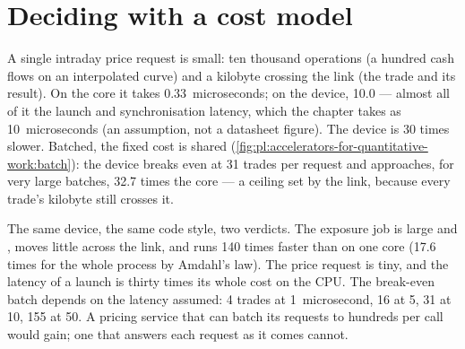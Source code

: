 \section{Deciding with a cost model}

A single intraday price request is small: ten thousand operations (a hundred cash flows on an interpolated curve) and a kilobyte crossing
the link (the trade and its result). On the core it takes 0.33~microseconds; on the device, 10.0 --- almost all of it the launch and
synchronisation latency, which the chapter takes as 10~microseconds (an assumption, not a datasheet figure). The device is 30 times slower.
Batched, the fixed cost is shared (\cref{fig:pl:accelerators-for-quantitative-work:batch}): the device breaks even at 31 trades per request
and approaches, for very large batches, 32.7 times the core --- a ceiling set by the link, because every trade's kilobyte still crosses it.

\begin{omfigure}

\label{fig:pl:accelerators-for-quantitative-work:batch}
\end{omfigure}

\begin{example}\label{ex:pl:accelerators-for-quantitative-work:verdict}
The same device, the same code style, two verdicts. The exposure job is large and , moves little across the link, and runs 140
times faster than on one core (17.6 times for the whole process by Amdahl's law). The price request is tiny, and the latency of a launch is
thirty times its whole cost on the CPU. The break-even batch depends on the latency assumed: 4 trades at 1~microsecond, 16 at 5, 31 at 10,
155 at 50. A pricing service that can batch its requests to hundreds per call would gain; one that answers each request as it comes cannot.
\end{example}

